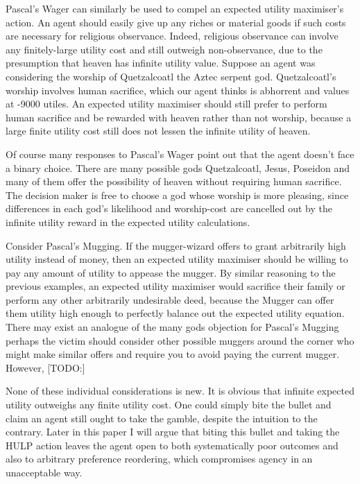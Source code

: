 \documentclass{article}
\begin{document}
Pascal's Wager can similarly be used to compel an expected utility maximiser's action. An agent should easily give up any riches or material goods if such costs are necessary for religious observance. Indeed, religious observance can involve any finitely-large utility cost and still outweigh non-observance, due to the presumption that heaven has infinite utility value. Suppose an agent was considering the worship of Quetzalcoatl the Aztec serpent god. Quetzalcoatl's worship involves human sacrifice, which our agent thinks is abhorrent and values at -9000 utiles. An expected utility maximiser should still prefer to perform human sacrifice and be rewarded with heaven rather than not worship, because a large finite utility cost still does not lessen the infinite utility of heaven. 

Of course many responses \citep{mackie1990miracle, diderot1746pensees} to Pascal's Wager point out that the agent doesn't face a binary choice. There are many possible gods \textemdash{} Quetzalcoatl, Jesus, Poseidon \textemdash{} and many of them offer the possibility of heaven without requiring human sacrifice. The decision maker is free to choose a god whose worship is more pleasing, since differences in each god's likelihood and worship-cost are cancelled out by the infinite utility reward in the expected utility calculations.

Consider Pascal's Mugging. If the mugger-wizard offers to grant arbitrarily high utility instead of money, then an expected utility maximiser should be willing to pay any amount of utility to appease the mugger. By similar reasoning to the previous examples, an expected utility maximiser would sacrifice their family or perform any other arbitrarily undesirable deed, because the Mugger can offer them utility high enough to perfectly balance out the expected utility equation. There may exist an analogue of the many gods objection for Pascal's Mugging \textemdash{} perhaps the victim should consider other possible muggers around the corner who might make similar offers and require you to avoid paying the current mugger. However, [TODO:]

None of these individual considerations is new. It is obvious that infinite expected utility outweighs any finite utility cost. One could simply bite the bullet and claim an agent still ought to take the gamble, despite the intuition to the contrary. Later in this paper I will argue that biting this bullet and taking the HULP action leaves the agent open to both systematically poor outcomes and also to arbitrary preference reordering, which compromises agency in an unacceptable way.
\end{document}
